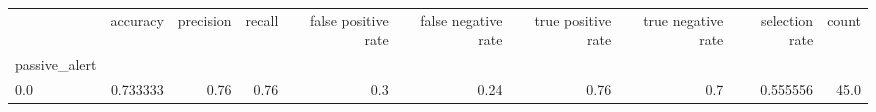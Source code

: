 \begin{tabular}{lrrrrrrrrr}
\toprule
{} &  accuracy &  precision &  recall &  false positive rate &  false negative rate &  true positive rate &  true negative rate &  selection rate &  count \\
passive\_alert &           &            &         &                      &                      &                     &                     &                 &        \\
\midrule
0.0           &  0.733333 &       0.76 &    0.76 &                  0.3 &                 0.24 &                0.76 &                 0.7 &        0.555556 &   45.0 \\
\bottomrule
\end{tabular}
